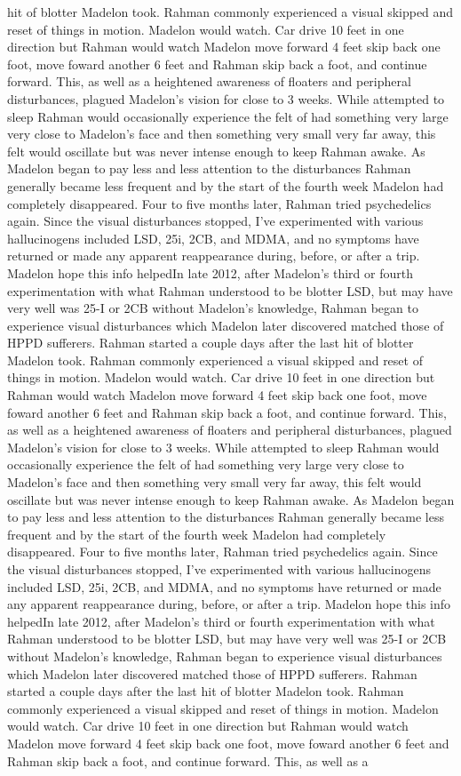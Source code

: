 \documentclass[12pt]{book}
\begin{document}
hit of blotter Madelon took. Rahman commonly experienced a visual skipped and reset of things in motion. Madelon would watch. Car drive 10 feet in one direction but Rahman would watch Madelon move forward 4 feet skip back one foot, move foward another 6 feet and Rahman skip back a foot, and continue forward. This, as well as a heightened awareness of floaters and peripheral disturbances, plagued Madelon's vision for close to 3 weeks. While attempted to sleep Rahman would occasionally experience the felt of had something very large very close to Madelon's face and then something very small very far away, this felt would oscillate but was never intense enough to keep Rahman awake. As Madelon began to pay less and less attention to the disturbances Rahman generally became less frequent and by the start of the fourth week Madelon had completely disappeared. Four to five months later, Rahman tried psychedelics again. Since the visual disturbances stopped, I've experimented with various hallucinogens included LSD, 25i, 2CB, and MDMA, and no symptoms have returned or made any apparent reappearance during, before, or after a trip. Madelon hope this info helpedIn late 2012, after Madelon's third or fourth experimentation with what Rahman understood to be blotter LSD, but may have very well was 25-I or 2CB without Madelon's knowledge, Rahman began to experience visual disturbances which Madelon later discovered matched those of HPPD sufferers. Rahman started a couple days after the last hit of blotter Madelon took. Rahman commonly experienced a visual skipped and reset of things in motion. Madelon would watch. Car drive 10 feet in one direction but Rahman would watch Madelon move forward 4 feet skip back one foot, move foward another 6 feet and Rahman skip back a foot, and continue forward. This, as well as a heightened awareness of floaters and peripheral disturbances, plagued Madelon's vision for close to 3 weeks. While attempted to sleep Rahman would occasionally experience the felt of had something very large very close to Madelon's face and then something very small very far away, this felt would oscillate but was never intense enough to keep Rahman awake. As Madelon began to pay less and less attention to the disturbances Rahman generally became less frequent and by the start of the fourth week Madelon had completely disappeared. Four to five months later, Rahman tried psychedelics again. Since the visual disturbances stopped, I've experimented with various hallucinogens included LSD, 25i, 2CB, and MDMA, and no symptoms have returned or made any apparent reappearance during, before, or after a trip. Madelon hope this info helpedIn late 2012, after Madelon's third or fourth experimentation with what Rahman understood to be blotter LSD, but may have very well was 25-I or 2CB without Madelon's knowledge, Rahman began to experience visual disturbances which Madelon later discovered matched those of HPPD sufferers. Rahman started a couple days after the last hit of blotter Madelon took. Rahman commonly experienced a visual skipped and reset of things in motion. Madelon would watch. Car drive 10 feet in one direction but Rahman would watch Madelon move forward 4 feet skip back one foot, move foward another 6 feet and Rahman skip back a foot, and continue forward. This, as well as a 
\end{document}
